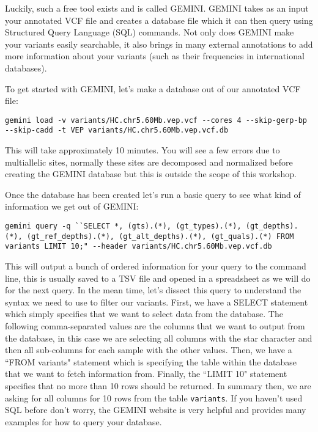 Luckily, such a free tool exists and is called GEMINI. GEMINI takes as an input your annotated VCF file and creates a database file which it can then query using Structured Query Language (SQL) commands. Not only does GEMINI make your variants easily searchable, it also brings in many external annotations to add more information about your variants (such as their frequencies in international databases).\\

\begin{steps}
To get started with GEMINI, let's make a database out of our annotated VCF file:
\begin{lstlisting}
gemini load -v variants/HC.chr5.60Mb.vep.vcf --cores 4 --skip-gerp-bp --skip-cadd -t VEP variants/HC.chr5.60Mb.vep.vcf.db
\end{lstlisting}
\end{steps}

This will take approximately 10 minutes. You will see a few errors due to multiallelic sites, normally these sites are decomposed and normalized before creating the GEMINI database but this is outside the scope of this workshop.\\

\begin{steps}
Once the database has been created let's run a basic query to see what kind of information we get out of GEMINI:
\begin{lstlisting}
gemini query -q ``SELECT *, (gts).(*), (gt_types).(*), (gt_depths).(*), (gt_ref_depths).(*), (gt_alt_depths).(*), (gt_quals).(*) FROM variants LIMIT 10;" --header variants/HC.chr5.60Mb.vep.vcf.db
\end{lstlisting}
\end{steps}

This will output a bunch of ordered information for your query to the command line, this is usually saved to a TSV file and opened in a spreadsheet as we will do for the next query. In the mean time, let's dissect this query to understand the syntax we need to use to filter our variants. First, we have a SELECT statement which simply specifies that we want to select data from the database. The following comma-separated values are the columns that we want to output from the database, in this case we are selecting all columns with the star character and then all sub-columns for each sample with the other values. Then, we have a ``FROM variants" statement which is specifying the table within the database that we want to fetch information from. Finally, the ``LIMIT 10" statement specifies that no more than 10 rows should be returned. In summary then, we are asking for all columns for 10 rows from the table \texttt{variants}. If you haven't used SQL before don't worry, the GEMINI website is very helpful and provides many examples for how to query your database.\\

